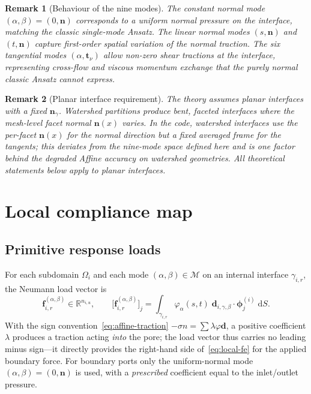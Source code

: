 \documentclass[11pt,a4paper]{article}
\newtheorem{remark}{Remark}
\newcommand{\R}{\mathbb{R}}
\newcommand{\pore}[1]{\Omega_{#1}}
\newcommand{\iface}{\gamma}
\newcommand{\normal}{\bm{n}}
\newcommand{\modeset}{\mathcal{M}}
\begin{document}
\begin{remark}[Behaviour of the nine modes]\label{rem:modes}
  The constant normal mode $(\alpha,\beta)=(0,\normal)$ corresponds to
  a uniform normal pressure on the interface, matching the classic
  single-mode Ansatz.  The linear normal modes $(s,\normal)$ and
  $(t,\normal)$ capture first-order spatial variation of the normal
  traction.  The six tangential modes $(\alpha,\bm{t}_\nu)$ allow
  non-zero shear tractions at the interface, representing cross-flow
  and viscous momentum exchange that the purely normal classic Ansatz
  cannot express.
\end{remark}

\begin{remark}[Planar interface requirement]\label{rem:planar}
  The theory assumes planar interfaces with a fixed $\normal_\gamma$.
  Watershed partitions produce bent, faceted interfaces where the
  mesh-level facet normal $\normal(x)$ varies.  In the code,
  watershed interfaces use the per-facet $\normal(x)$ for the normal
  direction but a fixed averaged frame for the tangents; this
  deviates from the nine-mode space defined here and is one factor
  behind the degraded Affine accuracy on watershed geometries.
  All theoretical statements below apply to planar interfaces.
\end{remark}

\section{Local compliance map}

\subsection{Primitive response loads}

For each subdomain $\pore{i}$ and each mode $(\alpha,\beta) \in \modeset$
on an internal interface $\iface_{i,r}$, the Neumann load vector is
\begin{equation}\label{eq:unit-load}
  \bm{f}_{i,r}^{(\alpha,\beta)} \in \R^{n_{i,u}},\qquad
  \bigl[\bm{f}_{i,r}^{(\alpha,\beta)}\bigr]_j
  = \int_{\iface_{i,r}} \varphi_\alpha(s,t)\;
    \bm{d}_{i,\gamma,\beta} \cdot \bm{\phi}_j^{(i)} \;\mathrm{d}S.
\end{equation}
With the sign convention~\eqref{eq:affine-traction}
$-\sigma n = \sum \lambda\varphi\bm{d}$, a positive coefficient
$\lambda$ produces a traction acting \emph{into} the pore; the load
vector thus carries no leading minus sign---it directly provides the
right-hand side of~\eqref{eq:local-fe} for the applied boundary force.
For boundary ports only the uniform-normal mode
$(\alpha,\beta)=(0,\normal)$ is used, with a \emph{prescribed}
coefficient equal to the inlet/outlet pressure.
\end{document}
